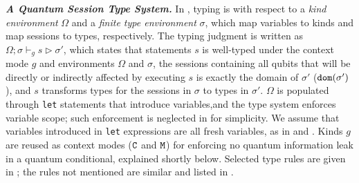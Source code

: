 \noindent\textbf{\textit{A Quantum Session Type System.}}\label{sec:type-checking}
%
In \qafny, typing is with respect to a \emph{kind environment} $\Omega$ and a \emph{finite type environment} $\sigma$,
which map \qafny variables to kinds and map sessions to types, respectively.
The typing judgment is written as $\Omega; \sigma\vdash_{g} s \triangleright \sigma'$,
which states that statements $s$ is well-typed under the context mode $g$ and environments $\Omega$ and $\sigma$,
the sessions containing all qubits that will be directly or indirectly affected by executing $s$ is exactly the domain of $\sigma'$ ($\mathtt{dom}(\sigma')$), and $s$ transforms types for the sessions in $\sigma$ to types in $\sigma'$.
$\Omega$ is populated through \texttt{let} statements that introduce variables,and 
the type system enforces variable scope; such enforcement is neglected in  for simplicity.
We assume that variables introduced in \texttt{let} expressions are all fresh variables, as in  and .
Kinds $g$ are reused as context modes ($\texttt{C}$ and $\texttt{M}$) for enforcing no quantum information leak in a quantum conditional, explained shortly below.
Selected type rules are given in ; the rules not mentioned are similar and listed in .

